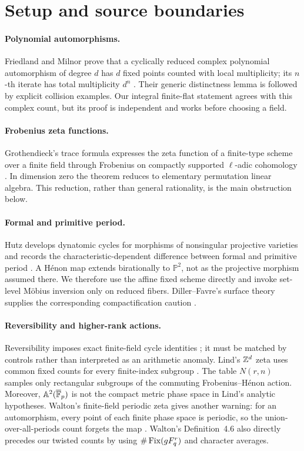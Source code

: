\section{Setup and source boundaries}

\paragraph{Polynomial automorphisms.}
Friedland and Milnor prove that a cyclically reduced complex polynomial
automorphism of degree $d$ has $d$ fixed points counted with local
multiplicity; its $n$-th iterate has total multiplicity $d^n$
\citep[Theorem~3.1]{friedland1989}.  Their generic distinctness lemma is
followed by explicit collision examples.  Our integral finite-flat statement
agrees with this complex count, but its proof is independent and works before
choosing a field.

\paragraph{Frobenius zeta functions.}
Grothendieck's trace formula expresses the zeta function of a finite-type
scheme over a finite field through Frobenius on compactly supported
$\ell$-adic cohomology \citep{grothendieck1965}.  In dimension zero the theorem
reduces to elementary permutation linear algebra.  This reduction, rather
than general rationality, is the main obstruction below.

\paragraph{Formal and primitive period.}
Hutz develops dynatomic cycles for morphisms of nonsingular projective
varieties and records the characteristic-dependent difference between formal
and primitive period \citep{hutz2010}.  A H\'enon map extends birationally to
$\mathbb P^2$, not as the projective morphism assumed there.  We therefore use
the affine fixed scheme directly and invoke set-level M\"obius inversion only
on reduced fibers.  Diller--Favre's surface theory supplies the corresponding
compactification caution \citep{diller2001}.

\paragraph{Reversibility and higher-rank actions.}
Reversibility imposes exact finite-field cycle identities
\citep{roberts2005}; it must be matched by controls rather than interpreted as
an arithmetic anomaly.  Lind's $\mathbb Z^d$ zeta uses common fixed counts for every
finite-index subgroup \citep{lind1996}.  The table $N(r,n)$ samples only
rectangular subgroups of the commuting Frobenius--H\'enon action.  Moreover,
$\mathbb A^2(\overline{\mathbb F}_p)$ is not the compact metric phase space in Lind's
analytic hypotheses.  Walton's finite-field periodic zeta gives another
warning: for an automorphism, every point of each finite phase space is
periodic, so the union-over-all-periods count forgets the map
\citep{walton2018}.  Walton's Definition~4.6 also directly precedes our
twisted counts by using $\#\operatorname{Fix}(gF_q^r)$ and character averages.


